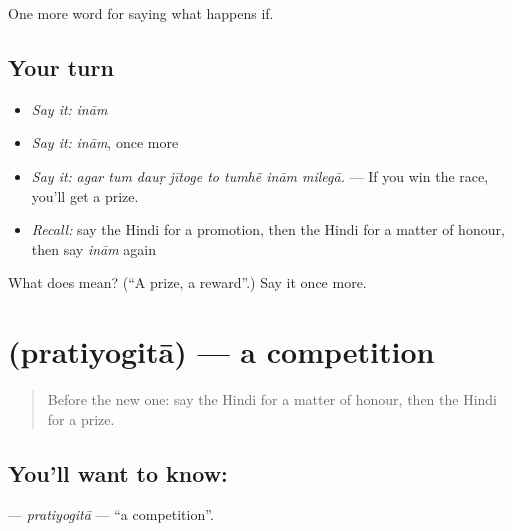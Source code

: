 \begin{grammarlens}[title={What you've built}]
One more word for saying what happens if.
\end{grammarlens}

\subsection*{Your turn}
\begin{itemize}
\raggedright
  \item \emph{Say it:} \emph{inām}
  \item \emph{Say it:} \emph{inām}, once more
  \item \emph{Say it:} \emph{agar tum dauṛ jītoge to tumhẽ inām milegā.} — If you win the race, you'll get a prize.
  \item \emph{Recall:} say the Hindi for a promotion, then the Hindi for a matter of honour, then say \emph{inām} again
\end{itemize}

\begin{tcolorbox}[breakable,colback=teal!4,colframe=teal!35!black,title={Before you move on}]
What does  mean? (\textquotedblleft{}A prize, a reward\textquotedblright{}.) Say it once more.
\end{tcolorbox}
\section[\texorpdfstring{\hi{प्रतियोगिता} (pratiyogitā)}{प्रतियोगिता (pratiyogitā)}]{ (pratiyogitā) — a competition}

\label{lesson:HI-C394-pratiyogita}



\begin{quote}
Before the new one: say the Hindi for a matter of honour, then the Hindi for a prize.
\end{quote}

\subsection*{You'll want to know: }
\textbf{} — \emph{pratiyogitā} — \textquotedblleft{}a competition\textquotedblright{}.

\begin{quote}
       
\end{quote}

